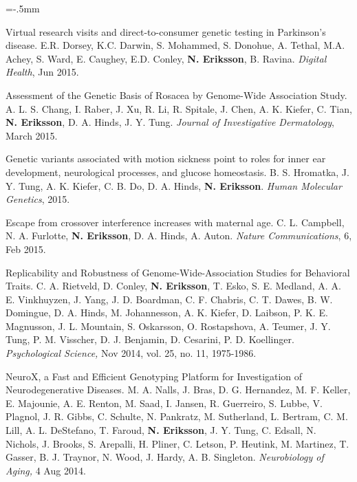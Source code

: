 \documentclass[11pt]{article}
\newenvironment{papers}[1][1]
	{\vspace{-2ex}\leftmargini=16.1mm%
	 \begin{revnumerate}[{#1}]\itemsep=-.5mm}
	{\end{revnumerate}\vspace{-2ex}}
\def\paper{\item}
\def\paperyear#1{\item[\addtocounter{enumi}{-1}%
		 {\makebox[0mm][r]{\makebox[14mm]{#1\hfill\arabic{enumi}.}}}]}
\begin{document}
\begin{papers}[47]
                    \paperyear{2015}
        Virtual research visits and direct-to-consumer genetic testing in Parkinson’s disease.
        E.R. Dorsey, K.C. Darwin, S. Mohammed, S. Donohue, A. Tethal, M.A. Achey, S. Ward, E. Caughey, E.D. Conley, \textbf{N. Eriksson}, B. Ravina.
        \textit{Digital Health}, Jun 2015.

            \paper
        Assessment of the Genetic Basis of Rosacea by Genome-Wide Association Study.
        A. L. S. Chang, I. Raber, J. Xu, R. Li, R. Spitale, J. Chen, A. K. Kiefer, C. Tian, \textbf{N. Eriksson}, D. A. Hinds, J. Y. Tung.
        \textit{Journal of Investigative Dermatology}, March 2015.

            \paper
        Genetic variants associated with motion sickness point to roles for inner ear development, neurological processes, and glucose homeostasis.
        B. S. Hromatka, J. Y. Tung, A. K. Kiefer, C. B. Do, D. A. Hinds, \textbf{N. Eriksson}.
        \textit{Human Molecular Genetics}, 2015.

            \paper
        Escape from crossover interference increases with maternal age.
        C. L. Campbell, N. A. Furlotte, \textbf{N. Eriksson}, D. A. Hinds, A. Auton.
        \textit{Nature Communications}, 6, Feb 2015.

                    \paperyear{2014}
        Replicability and Robustness of Genome-Wide-Association Studies for Behavioral Traits.
        C. A. Rietveld, D. Conley, \textbf{N. Eriksson}, T. Esko, S. E. Medland, A. A. E. Vinkhuyzen, J. Yang, J. D. Boardman, C. F. Chabris, C. T. Dawes, B. W. Domingue, D. A. Hinds, M. Johannesson, A. K. Kiefer, D. Laibson, P. K. E. Magnusson, J. L. Mountain, S. Oskarsson, O. Rostapshova, A. Teumer, J. Y. Tung, P. M. Visscher, D. J. Benjamin, D. Cesarini, P. D. Koellinger.
        \textit{Psychological Science,} Nov 2014, vol. 25, no. 11, 1975-1986.

            \paper
        NeuroX, a Fast and Efficient Genotyping Platform for Investigation of Neurodegenerative Diseases.
        M. A. Nalls, J. Bras, D. G. Hernandez, M. F. Keller, E. Majounie, A. E. Renton, M. Saad, I. Jansen, R. Guerreiro, S. Lubbe, V. Plagnol, J. R. Gibbs, C. Schulte, N. Pankratz, M. Sutherland, L. Bertram, C. M. Lill, A. L. DeStefano, T. Faroud, \textbf{N. Eriksson}, J. Y. Tung, C. Edsall, N. Nichols, J. Brooks, S. Arepalli, H. Pliner, C. Letson, P. Heutink, M. Martinez, T. Gasser, B. J. Traynor, N. Wood, J. Hardy, A. B. Singleton.
        \textit{Neurobiology of Aging,} 4 Aug 2014.


\end{papers}
\end{document}
